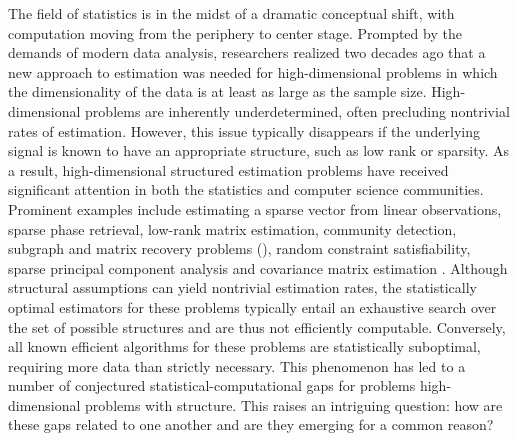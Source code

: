\documentclass[11pt]{article}
\begin{document}
The field of statistics is in the midst of a dramatic conceptual shift, with computation moving from the periphery to center stage. Prompted by the demands of modern data analysis, researchers realized two decades ago that a new approach to estimation was needed for high-dimensional problems in which the dimensionality of the data is at least as large as the sample size. High-dimensional problems are inherently underdetermined, often precluding nontrivial rates of estimation. However, this issue typically disappears if the underlying signal is known to have an appropriate structure, such as low rank or sparsity. As a result, high-dimensional structured estimation problems have received significant attention in both the statistics and computer science communities. Prominent examples  include estimating a sparse vector from linear observations, sparse phase retrieval, low-rank matrix estimation, community detection, subgraph and matrix recovery problems (\cite{butucea2013detection}), random constraint satisfiability, sparse principal component analysis \cite{johnstoneSparse04, johnstone2009consistency, amini2009high, vu2012minimax, berthet2013optimal, cai2015optimal} and covariance matrix estimation \cite{bickel2008regularized, cai2010optimal, cai2011adaptive}. Although structural assumptions can yield nontrivial estimation rates, the statistically optimal estimators for these problems typically entail an exhaustive search over the set of possible structures and are thus not efficiently computable. Conversely, all known efficient algorithms for these problems are statistically suboptimal, requiring more data than strictly necessary. This phenomenon has led to a number of conjectured statistical-computational gaps for problems high-dimensional problems with structure. This raises an intriguing question: how are these gaps related to one another and are they emerging for a common reason?
\end{document}
